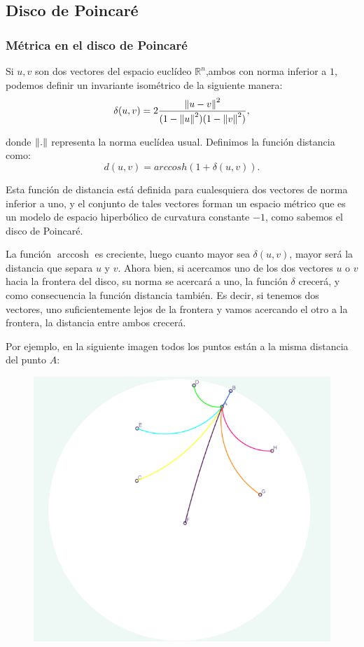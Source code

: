 \documentclass{article}
\theoremstyle{plain}
\theoremstyle{definition}
\theoremstyle{remark}
\newcommand{\norm}[1]{\ensuremath\left\Vert #1 \right\Vert}
\begin{document}
\subsection{Disco de Poincaré}

\subsubsection{Métrica en el disco de Poincaré}
Si $u,v$ son dos vectores del espacio euclídeo $\mathbb{R}^n$,ambos
con norma inferior a $1$, podemos definir un invariante isométrico de
la siguiente manera:
\[\delta (u,v)=2\frac{\norm{u-v}^2}{(1-\norm{u}^2)(1-\norm{v}^2)},\]

donde $\norm{.}$ representa la norma euclídea usual. Definimos la
función distancia como:
\[d(u,v)=arccosh(1+\delta(u,v)).\]

Esta función de distancia está definida para cualesquiera dos vectores
de norma inferior a uno, y el conjunto de tales vectores forman un
espacio métrico que es un modelo de espacio hiperbólico de curvatura
constante $-1$, como sabemos el disco de Poincaré.

La función $\operatorname{arccosh}$ es creciente, luego cuanto mayor
sea $\delta(u,v)$, mayor será la distancia que separa $u$ y $v$. Ahora
bien, si acercamos uno de los dos vectores $u$ o $v$ hacia la frontera
del disco, su norma se acercará a uno, la función $\delta$ crecerá, y
como consecuencia la función distancia también. Es decir, si tenemos
dos vectores, uno suficientemente lejos de la frontera y vamos
acercando el otro a la frontera, la distancia entre ambos crecerá.

Por ejemplo, en la siguiente imagen todos los puntos están a la misma
distancia del punto $A$:

\begin{figure}[h]
\includegraphics{Distancias.png}
\end{figure}
\end{document}
